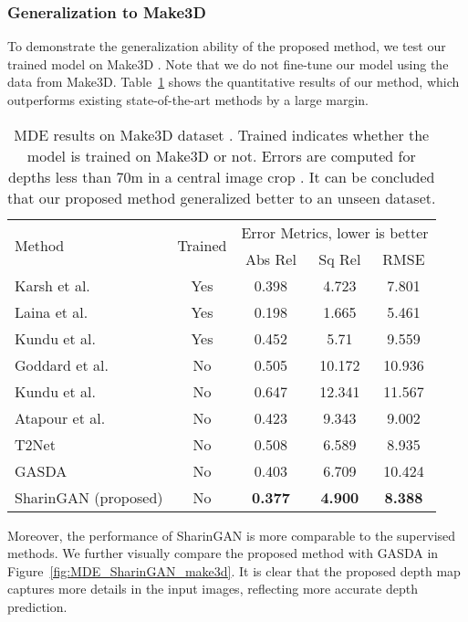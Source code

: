 \documentclass[10pt,twocolumn,letterpaper]{article}
\begin{document}
\subsubsection{Generalization to Make3D}
To demonstrate the generalization ability of the proposed method, we test our trained model on Make3D \cite{make3D}.
Note that we do not fine-tune our model using the data from Make3D.
Table~\ref{tab:mde_results_make3d} shows the quantitative results of our method, which outperforms existing state-of-the-art methods by a large margin. 
\begin{table}[!h]
    
    \begin{adjustbox}{width=\linewidth}
    \centering
    \begin{tabular}{|l||c||c|c|c|}
    \hline
    \multirow{2}{*}{Method} & \multirow{2}{*}{Trained} & \multicolumn{3}{|c|}{Error Metrics, lower is better}\\
    \cline{3-5}
    & & Abs Rel & Sq Rel & RMSE\\
    
    \hline
        Karsh et al. \cite{Karsch} & Yes & 0.398 & 4.723 & 7.801\\
        Laina et al. \cite{Laina} & Yes & 0.198 & 1.665 & 5.461\\
        Kundu et al. \cite{adaDepth} & Yes & 0.452 & 5.71 & 9.559\\
        \hline
        \hline
        Goddard et al. \cite{Godard_2017_CVPR} & No & 0.505 & 10.172 & 10.936\\
        Kundu et al. \cite{adaDepth} & No & 0.647 & 12.341 & 11.567\\
        Atapour et al. \cite{Amir2018} & No & 0.423 & 9.343 & 9.002\\
        T2Net \cite{T2NET} & No & 0.508 & 6.589 & 8.935\\
        GASDA \cite{GASDA} & No & 0.403 & 6.709 & 10.424\\
SharinGAN (proposed) & No & \textbf{0.377} & \textbf{4.900} & \textbf{8.388}\\
    \hline
    \end{tabular}
    \end{adjustbox}
    \caption{MDE results on Make3D dataset \cite{make3D}. Trained indicates whether the model is trained on Make3D or not. Errors are computed for depths less than 70m in a central image crop \cite{Godard_2017_CVPR}. It can be concluded that our proposed method generalized better to an unseen dataset.}
    \label{tab:mde_results_make3d}
\end{table}
Moreover, the performance of SharinGAN is more comparable to the supervised methods.
We further visually compare the proposed method with GASDA \cite{GASDA} in Figure~\ref{fig:MDE_SharinGAN_make3d}.
It is clear that the proposed depth map captures more details in the input images, reflecting more accurate depth prediction.
\end{document}
